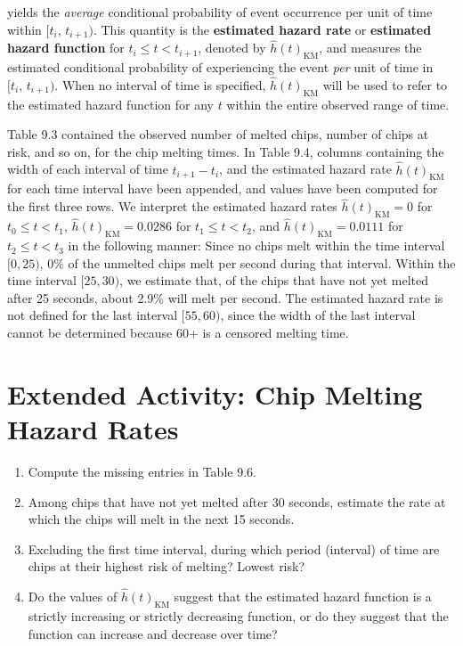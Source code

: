 \documentclass[
]{report}
\providecommand{\tightlist}{%
  \setlength{\itemsep}{0pt}\setlength{\parskip}{0pt}}
\begin{document}
yields the \emph{average} conditional probability of event occurrence per unit of time within \([t_i,\,t_{i+1})\). This quantity is the \textbf{estimated hazard rate} or \textbf{estimated hazard function} for \(t_i \le t < t_{i+1}\), denoted by \(\hat h(t)_{\mathrm{KM}}\), and measures the estimated conditional probability of experiencing the event \emph{per} unit of time in \([t_i,\,t_{i+1})\). When no interval of time is specified, \(\hat h(t)_{\mathrm{KM}}\) will be used to refer to the estimated hazard function for any \(t\) within the entire observed range of time.

Table 9.3 contained the observed number of melted chips, number of chips at risk, and so on, for the chip melting times. In Table 9.4, columns containing the width of each interval of time \(t_{i+1} - t_i\), and the estimated hazard rate \(\hat h(t)_{\mathrm{KM}}\) for each time interval have been appended, and values have been computed for the first three rows. We interpret the estimated hazard rates \(\hat h(t)_{\mathrm{KM}} = 0\) for \(t_0 \le t < t_1\), \(\hat h(t)_{\mathrm{KM}} = 0.0286\) for \(t_1 \le t < t_2\), and \(\hat h(t)_{\mathrm{KM}} = 0.0111\) for \(t_2 \le t < t_3\) in the following manner: Since no chips melt within the time interval \([0,25)\), 0\% of the unmelted chips melt per second during that interval. Within the time interval \([25,30)\), we estimate that, of the chips that have not yet melted after 25 seconds, about 2.9\% will melt per second. The estimated hazard rate is not defined for the last interval \([55,60)\), since the width of the last interval cannot be determined because 60+ is a censored melting time.

\section*{Extended Activity: Chip Melting Hazard Rates}\label{extended-activity-chip-melting-hazard-rates}

\begin{enumerate}
\def\labelenumi{\arabic{enumi}.}
\setcounter{enumi}{36}
\tightlist
\item
  Compute the missing entries in Table 9.6.\\
\item
  Among chips that have not yet melted after 30 seconds, estimate the rate at which the chips will melt in the next 15 seconds.\\
\item
  Excluding the first time interval, during which period (interval) of time are chips at their highest risk of melting? Lowest risk?\\
\item
  Do the values of \(\hat h(t)_{\mathrm{KM}}\) suggest that the estimated hazard function is a strictly increasing or strictly decreasing function, or do they suggest that the function can increase and decrease over time?
\end{enumerate}
\end{document}
